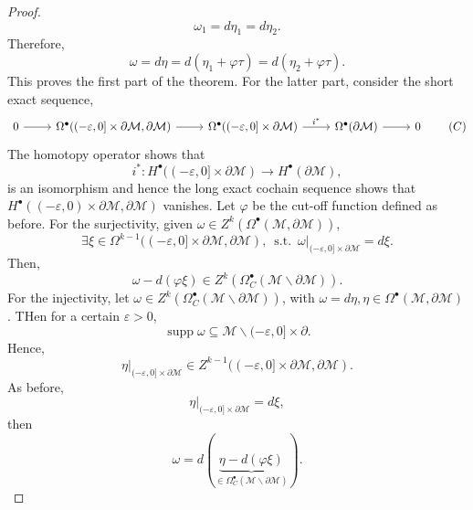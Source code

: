 \documentclass[8pt]{article}
\DeclareMathOperator{\straw}{s.t.}
\DeclareMathOperator{\supp}{supp}
\newcommand{\M}[0]{\mathcal{M}}
\newcommand{\st}[0]{\:\straw\:}
\begin{document}
\begin{proof}
  \begin{equation*}
    \omega_1 = d\eta_1 = d\eta_2.
  \end{equation*}
  Therefore,
  \begin{equation*}
    \omega = d\eta = d(\eta_1+\varphi\tau) = d(\eta_2+\varphi\tau).
  \end{equation*}
  This proves the first part of the theorem. For the latter part, consider the short exact sequence,
  \begin{equation*}
    \begin{tikzcd}
0 \arrow[r] & {\Omega^\bullet((-\varepsilon,0]\times\partial\M,\partial\M)} \arrow[r] & {\Omega^\bullet((-\varepsilon,0]\times\partial\M)} \arrow[r, "i^*"] & \Omega^\bullet(\partial\M) \arrow[r] & 0
\end{tikzcd}
\tag{$C$}\label{short_exact_sequence_rel_cohomology}
  \end{equation*}
  The homotopy operator shows that 
  \begin{equation*}
    i^*:H^\bullet((-\varepsilon,0]\times\partial\M)\to H^\bullet(\partial\M),
  \end{equation*}
  is an isomorphism and hence the long exact cochain sequence shows that 
  $H^\bullet((-\varepsilon,0)\times\partial\M,\partial\M)$ vanishes. Let $\varphi$ be the cut-off function defined as before. For the surjectivity, given $\omega\in Z^k(\Omega^\bullet(\M,\partial\M))$,
  \begin{equation*}
  \exists \xi\in\Omega^{k-1}((-\varepsilon,0]\times\partial\M,\partial\M),\st \omega|_{(-\varepsilon,0]\times\partial\M}=d\xi.
  \end{equation*}
  Then,
  \begin{equation*}
  \omega -d(\varphi\xi)\in Z^k(\Omega_C^\bullet(\M\backslash\partial\M)).
  \end{equation*}
  For the injectivity, let $\omega\in Z^k(\Omega_C^\bullet(\M\backslash\partial\M))$, with $\omega=d\eta,\eta\in\Omega^\bullet(\M,\partial\M)$. THen for a certain $\varepsilon>0$, 
  \begin{equation*}
  \supp\omega\subseteq\M\backslash(-\varepsilon,0]\times\partial.
  \end{equation*}
  Hence,
  \begin{equation*}
    \eta|_{(-\varepsilon,0]\times\partial\M}\in Z^{k-1}((-\varepsilon,0]\times\partial\M,\partial\M).
  \end{equation*}
  As before,
  \begin{equation*}
    \eta|_{(-\varepsilon,0]\times\partial\M}=d\xi,
  \end{equation*}
  then 
  \begin{equation*}
    \omega = d(\underbrace{\eta-d(\varphi\xi)}_{\in\Omega_C^\bullet(\M\backslash\partial\M)}).
  \end{equation*}
\end{proof}
\end{document}
